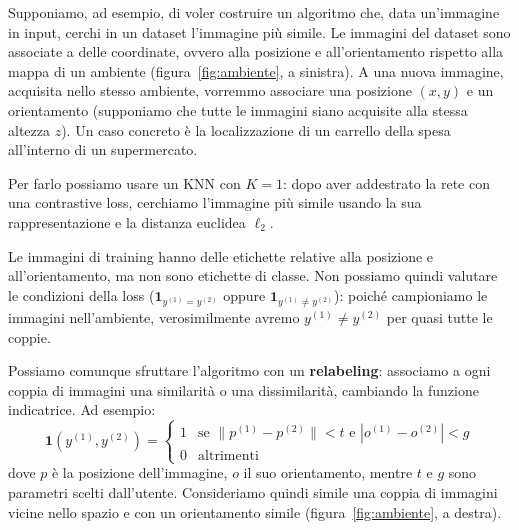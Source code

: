 Supponiamo, ad esempio, di voler costruire un algoritmo che, data un'immagine in input, cerchi in un dataset l'immagine più simile. Le immagini del dataset sono associate a delle coordinate, ovvero alla posizione e all'orientamento rispetto alla mappa di un ambiente (figura~\ref{fig:ambiente}, a sinistra). A una nuova immagine, acquisita nello stesso ambiente, vorremmo associare una posizione $(x, y)$ e un orientamento (supponiamo che tutte le immagini siano acquisite alla stessa altezza $z$). Un caso concreto è la localizzazione di un carrello della spesa all'interno di un supermercato.

Per farlo possiamo usare un KNN con $K = 1$: dopo aver addestrato la rete con una contrastive loss, cerchiamo l'immagine più simile usando la sua rappresentazione e la distanza euclidea $\ell_2$.

\begin{osservazione}
Le immagini di training hanno delle etichette relative alla posizione e all'orientamento, ma non sono etichette di classe. Non possiamo quindi valutare le condizioni della loss ($\mathbf{1}_{y^{(1)} = y^{(2)}}$ oppure $\mathbf{1}_{y^{(1)} \neq y^{(2)}}$): poiché campioniamo le immagini nell'ambiente, verosimilmente avremo $y^{(1)} \neq y^{(2)}$ per quasi tutte le coppie.
\end{osservazione}

Possiamo comunque sfruttare l'algoritmo con un \textbf{relabeling}: associamo a ogni coppia di immagini una similarità o una dissimilarità, cambiando la funzione indicatrice. Ad esempio:
\[
\mathbf{1}(y^{(1)}, y^{(2)}) =
\begin{cases}
1 & \text{se } \|p^{(1)} - p^{(2)}\| < t \text{ e } |o^{(1)} - o^{(2)}| < g \\
0 & \text{altrimenti}
\end{cases}
\]
dove $p$ è la posizione dell'immagine, $o$ il suo orientamento, mentre $t$ e $g$ sono parametri scelti dall'utente. Consideriamo quindi simile una coppia di immagini vicine nello spazio e con un orientamento simile (figura~\ref{fig:ambiente}, a destra).

